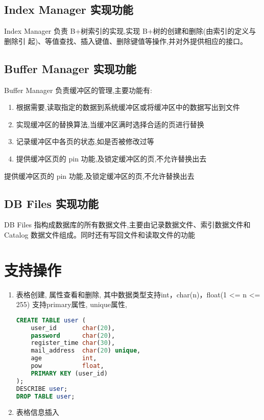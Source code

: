 \documentclass[10pt]{article}
\begin{document}
\begin{CJK}{UTF8}{gkai}
	\subsection{Index Manager 实现功能}
	Index Manager 负责 B+树索引的实现,实现 B+树的创建和删除(由索引的定义与删除引
	起)、等值查找、插入键值、删除键值等操作,并对外提供相应的接口。
	\subsection{Buffer Manager 实现功能}
	Buffer Manager 负责缓冲区的管理,主要功能有:
	\begin{enumerate}
		\item 根据需要,读取指定的数据到系统缓冲区或将缓冲区中的数据写出到文件
		\item 实现缓冲区的替换算法,当缓冲区满时选择合适的页进行替换
		\item 记录缓冲区中各页的状态,如是否被修改过等
		\item 提供缓冲区页的 pin 功能,及锁定缓冲区的页,不允许替换出去
	\end{enumerate}
	提供缓冲区页的 pin 功能,及锁定缓冲区的页,不允许替换出去
	\subsection{DB Files 实现功能}
	DB Files 指构成数据库的所有数据文件,主要由记录数据文件、索引数据文件和
	Catalog 数据文件组成。同时还有写回文件和读取文件的功能
	
	\section{支持操作}
	\begin{enumerate}
		\item 表格创建, 属性查看和删除, 其中数据类型支持int，char(n)，float(1 <= n <= 255)
				支持primary属性, unique属性,
		\begin{lstlisting}[language = sql]
CREATE TABLE user (
	user_id       char(20),
	password      char(20),
	register_time char(30),
	mail_address  char(20) unique,
	age           int,
	pow           float,
	PRIMARY KEY (user_id)
);
DESCRIBE user;
DROP TABLE user;
		\end{lstlisting}
		\item 表格信息插入
		

\end{enumerate}
\end{CJK}
\end{document}
